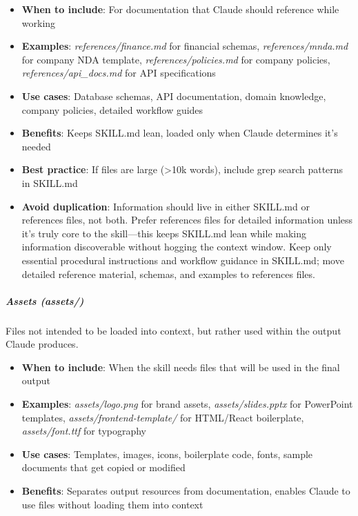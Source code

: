 \documentclass[11pt]{article}
\begin{document}
\begin{itemize}[leftmargin=*,itemsep=2pt,topsep=2pt]
\item {} \textbf{When to include}: For documentation that Claude should reference while working
\item {} \textbf{Examples}: \emph{references/finance.md} for financial schemas, \emph{references/mnda.md} for company NDA template, \emph{references/policies.md} for company policies, \emph{references/api\_\allowbreak{}docs.md} for API specifications
\item {} \textbf{Use cases}: Database schemas, API documentation, domain knowledge, company policies, detailed workflow guides
\item {} \textbf{Benefits}: Keeps SKILL.md lean, loaded only when Claude determines it's needed
\item {} \textbf{Best practice}: If files are large (>10k words), include grep search patterns in SKILL.md
\item {} \textbf{Avoid duplication}: Information should live in either SKILL.md or references files, not both. Prefer references files for detailed information unless it's truly core to the skill—this keeps SKILL.md lean while making information discoverable without hogging the context window. Keep only essential procedural instructions and workflow guidance in SKILL.md; move detailed reference material, schemas, and examples to references files.
\end{itemize}

\subparagraph{Assets (\emph{assets/})}\mbox{}\par

Files not intended to be loaded into context, but rather used within the output Claude produces.


\begin{itemize}[leftmargin=*,itemsep=2pt,topsep=2pt]
\item {} \textbf{When to include}: When the skill needs files that will be used in the final output
\item {} \textbf{Examples}: \emph{assets/logo.png} for brand assets, \emph{assets/slides.pptx} for PowerPoint templates, \emph{assets/frontend-template/} for HTML/React boilerplate, \emph{assets/font.ttf} for typography
\item {} \textbf{Use cases}: Templates, images, icons, boilerplate code, fonts, sample documents that get copied or modified
\item {} \textbf{Benefits}: Separates output resources from documentation, enables Claude to use files without loading them into context
\end{itemize}
\end{document}
